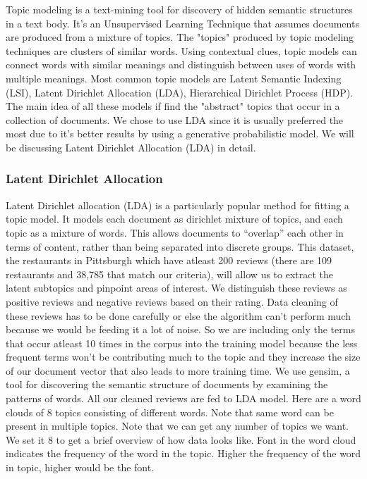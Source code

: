 \documentclass{neu_handout}
\begin{document}
Topic modeling is a text-mining tool for discovery of hidden semantic structures in a text body. It's an Unsupervised Learning Technique that assumes documents are produced from a mixture of topics. The "topics" produced by topic modeling techniques are clusters of similar words. Using contextual clues, topic models can connect words with similar meanings and distinguish between uses of words with multiple meanings. 
Most common topic models are Latent Semantic Indexing (LSI), Latent Dirichlet Allocation (LDA), Hierarchical Dirichlet Process (HDP). The main idea of all these models if find the "abstract" topics that occur in a collection of documents. We chose to use LDA since it is usually preferred the most due to it's better results by using a generative probabilistic model. We will be discussing Latent Dirichlet Allocation (LDA) in detail.

\subsubsection*{Latent Dirichlet Allocation}
Latent Dirichlet allocation (LDA) is a particularly popular method for fitting a topic model. It models each document as dirichlet mixture of topics, and each topic as a mixture of words. This allows documents to “overlap” each other in terms of content, rather than being separated into discrete groups.
This dataset, the restaurants in Pittsburgh which have atleast 200 reviews (there are 109 restaurants and 38,785 that match our criteria), will allow us to extract the latent subtopics and pinpoint areas of interest. We distinguish these reviews as positive reviews and negative reviews based on their rating. Data cleaning of these reviews has to be done carefully or else the algorithm can't perform much because we would be feeding it a lot of noise. So we are including only the terms that occur atleast 10 times in the corpus into the training model because the less frequent terms won't be contributing much to the topic and they increase the size of our document vector that also leads to more training time. We use gensim, a tool for discovering the semantic structure of documents by examining the patterns of words. All our cleaned reviews are fed to LDA model. Here are a word clouds of 8 topics consisting of different words. Note that same word can be present in multiple topics.
Note that we can get any number of topics we want. We set it 8 to get a brief overview of how data looks like. Font in the word cloud indicates the frequency of the word in the topic. Higher the frequency of the word in topic, higher would be the font.
\end{document}
